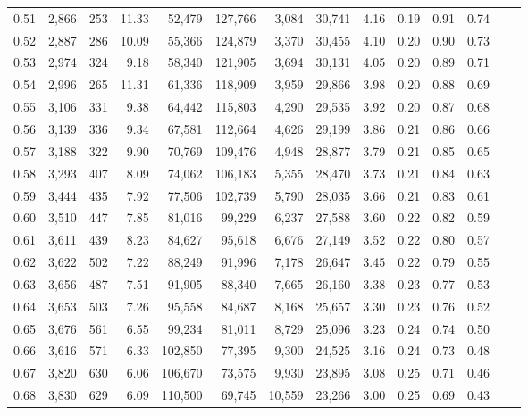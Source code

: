 \begin{tabular}{rrrrrrrrrrrrrr}
0.51 &  2,866 &  253 &   11.33 &   52,479 &  127,766 &   3,084 &  30,741 &  4.16 &  0.19 &  0.91 &      0.74 \\
0.52 &  2,887 &  286 &   10.09 &   55,366 &  124,879 &   3,370 &  30,455 &  4.10 &  0.20 &  0.90 &      0.73 \\
0.53 &  2,974 &  324 &    9.18 &   58,340 &  121,905 &   3,694 &  30,131 &  4.05 &  0.20 &  0.89 &      0.71 \\
0.54 &  2,996 &  265 &   11.31 &   61,336 &  118,909 &   3,959 &  29,866 &  3.98 &  0.20 &  0.88 &      0.69 \\
0.55 &  3,106 &  331 &    9.38 &   64,442 &  115,803 &   4,290 &  29,535 &  3.92 &  0.20 &  0.87 &      0.68 \\
0.56 &  3,139 &  336 &    9.34 &   67,581 &  112,664 &   4,626 &  29,199 &  3.86 &  0.21 &  0.86 &      0.66 \\
0.57 &  3,188 &  322 &    9.90 &   70,769 &  109,476 &   4,948 &  28,877 &  3.79 &  0.21 &  0.85 &      0.65 \\
0.58 &  3,293 &  407 &    8.09 &   74,062 &  106,183 &   5,355 &  28,470 &  3.73 &  0.21 &  0.84 &      0.63 \\
0.59 &  3,444 &  435 &    7.92 &   77,506 &  102,739 &   5,790 &  28,035 &  3.66 &  0.21 &  0.83 &      0.61 \\
0.60 &  3,510 &  447 &    7.85 &   81,016 &   99,229 &   6,237 &  27,588 &  3.60 &  0.22 &  0.82 &      0.59 \\
0.61 &  3,611 &  439 &    8.23 &   84,627 &   95,618 &   6,676 &  27,149 &  3.52 &  0.22 &  0.80 &      0.57 \\
0.62 &  3,622 &  502 &    7.22 &   88,249 &   91,996 &   7,178 &  26,647 &  3.45 &  0.22 &  0.79 &      0.55 \\
0.63 &  3,656 &  487 &    7.51 &   91,905 &   88,340 &   7,665 &  26,160 &  3.38 &  0.23 &  0.77 &      0.53 \\
0.64 &  3,653 &  503 &    7.26 &   95,558 &   84,687 &   8,168 &  25,657 &  3.30 &  0.23 &  0.76 &      0.52 \\
0.65 &  3,676 &  561 &    6.55 &   99,234 &   81,011 &   8,729 &  25,096 &  3.23 &  0.24 &  0.74 &      0.50 \\
0.66 &  3,616 &  571 &    6.33 &  102,850 &   77,395 &   9,300 &  24,525 &  3.16 &  0.24 &  0.73 &      0.48 \\
0.67 &  3,820 &  630 &    6.06 &  106,670 &   73,575 &   9,930 &  23,895 &  3.08 &  0.25 &  0.71 &      0.46 \\
0.68 &  3,830 &  629 &    6.09 &  110,500 &   69,745 &  10,559 &  23,266 &  3.00 &  0.25 &  0.69 &      0.43 \\

\end{tabular}

